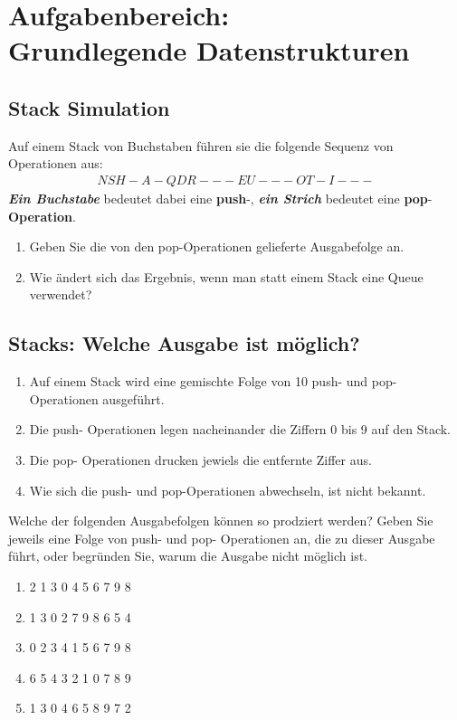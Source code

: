 \documentclass{article}
\begin{document}
\section{Aufgabenbereich:\\Grundlegende Datenstrukturen}

\subsection{Stack Simulation}
Auf einem Stack von Buchstaben führen sie die folgende Sequenz von Operationen aus:
\begin{align*}
    & N S H - A - Q D R - - - E U - - - O T - I - - - &
\end{align*}
\textbf{\textit{Ein Buchstabe}} bedeutet dabei eine \textbf{push}-, \textbf{\textit{ein Strich}} bedeutet eine \textbf{pop}- \\\textbf{Operation}.
\begin{enumerate}[label=\textcolor{purple}{$\alph*)$}]
    \item Geben Sie die von den pop-Operationen gelieferte Ausgabefolge an.
    \item Wie ändert sich das Ergebnis, wenn man statt einem Stack eine Queue verwendet?
\end{enumerate}

\subsection{Stacks: Welche Ausgabe ist möglich?}
\begin{enumerate}[label=\textcolor{purple}{$\bullet$}]
    \item Auf einem Stack wird eine gemischte Folge von 10 push- und pop- Operationen ausgeführt.
    \item Die push- Operationen legen nacheinander die Ziffern 0 bis 9 auf den Stack.
    \item Die pop- Operationen drucken jewiels die entfernte Ziffer aus.
    \item Wie sich die push- und pop-Operationen abwechseln, ist nicht bekannt.
\end{enumerate}
Welche der folgenden Ausgabefolgen können so prodziert werden? Geben Sie jeweils eine Folge von push- und pop- Operationen an, die zu dieser Ausgabe führt, oder begründen Sie, warum die Ausgabe nicht möglich ist.
\begin{enumerate}[label=$\arabic*)$]
    \item 2 1 3 0 4 5 6 7 9 8
    \item 1 3 0 2 7 9 8 6 5 4
    \item 0 2 3 4 1 5 6 7 9 8
    \item 6 5 4 3 2 1 0 7 8 9
    \item 1 3 0 4 6 5 8 9 7 2
\end{enumerate}
\end{document}
